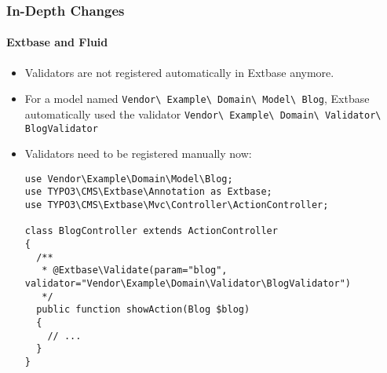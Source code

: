 \begin{frame}[fragile]
	\frametitle{In-Depth Changes}
	\framesubtitle{Extbase and Fluid}

	\lstset{basicstyle=\tiny\ttfamily}

	\begin{itemize}
		\item Validators are not registered automatically in Extbase anymore.
		\item For a model named
			\small\texttt{Vendor\textbackslash
				Example\textbackslash
				Domain\textbackslash
				Model\textbackslash
				Blog}\normalsize,\newline
			Extbase automatically used the validator
			\small\texttt{Vendor\textbackslash
				Example\textbackslash
				Domain\textbackslash
				Validator\textbackslash
				BlogValidator}\normalsize

		\item Validators need to be registered manually now:
\begin{lstlisting}
use Vendor\Example\Domain\Model\Blog;
use TYPO3\CMS\Extbase\Annotation as Extbase;
use TYPO3\CMS\Extbase\Mvc\Controller\ActionController;

class BlogController extends ActionController
{
  /**
   * @Extbase\Validate(param="blog", validator="Vendor\Example\Domain\Validator\BlogValidator")
   */
  public function showAction(Blog $blog)
  {
    // ...
  }
}
\end{lstlisting}

	\end{itemize}

\end{frame}


